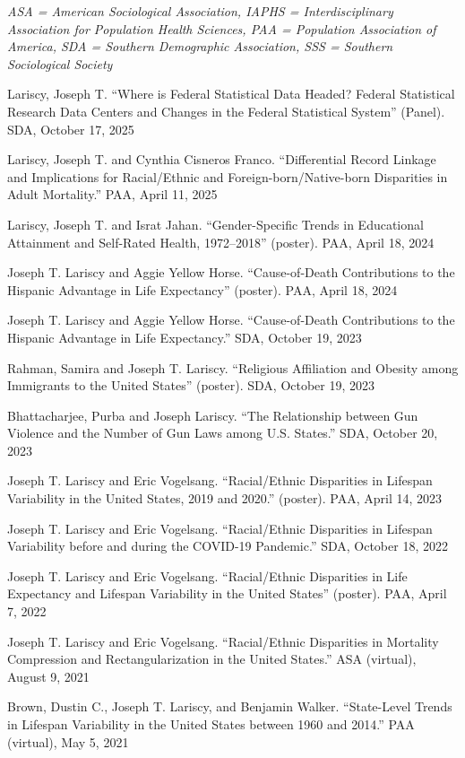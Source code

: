 \documentclass[11pt,]{article}
\begin{document}
\emph{ASA = American Sociological Association, IAPHS = Interdisciplinary
Association for Population Health Sciences, PAA = Population Association
of America, SDA = Southern Demographic Association, SSS = Southern
Sociological Society}

Lariscy, Joseph T. ``Where is Federal Statistical Data Headed? Federal
Statistical Research Data Centers and Changes in the Federal Statistical
System'' (Panel). SDA, October 17, 2025

Lariscy, Joseph T. and Cynthia Cisneros Franco. ``Differential Record
Linkage and Implications for Racial/Ethnic and Foreign-born/Native-born
Disparities in Adult Mortality.'' PAA, April 11, 2025

Lariscy, Joseph T. and Israt Jahan. ``Gender-Specific Trends in
Educational Attainment and Self-Rated Health, 1972--2018'' (poster).
PAA, April 18, 2024

Joseph T. Lariscy and Aggie Yellow Horse. ``Cause-of-Death Contributions
to the Hispanic Advantage in Life Expectancy'' (poster). PAA, April 18,
2024

Joseph T. Lariscy and Aggie Yellow Horse. ``Cause-of-Death Contributions
to the Hispanic Advantage in Life Expectancy.'' SDA, October 19, 2023

Rahman, Samira and Joseph T. Lariscy. ``Religious Affiliation and
Obesity among Immigrants to the United States'' (poster). SDA, October
19, 2023

Bhattacharjee, Purba and Joseph Lariscy. ``The Relationship between Gun
Violence and the Number of Gun Laws among U.S. States.'' SDA, October
20, 2023

Joseph T. Lariscy and Eric Vogelsang. ``Racial/Ethnic Disparities in
Lifespan Variability in the United States, 2019 and 2020.'' (poster).
PAA, April 14, 2023

Joseph T. Lariscy and Eric Vogelsang. ``Racial/Ethnic Disparities in
Lifespan Variability before and during the COVID-19 Pandemic.'' SDA,
October 18, 2022

Joseph T. Lariscy and Eric Vogelsang. ``Racial/Ethnic Disparities in
Life Expectancy and Lifespan Variability in the United States''
(poster). PAA, April 7, 2022

Joseph T. Lariscy and Eric Vogelsang. ``Racial/Ethnic Disparities in
Mortality Compression and Rectangularization in the United States.'' ASA
(virtual), August 9, 2021

Brown, Dustin C., Joseph T. Lariscy, and Benjamin Walker. ``State-Level
Trends in Lifespan Variability in the United States between 1960 and
2014.'' PAA (virtual), May 5, 2021
\end{document}
